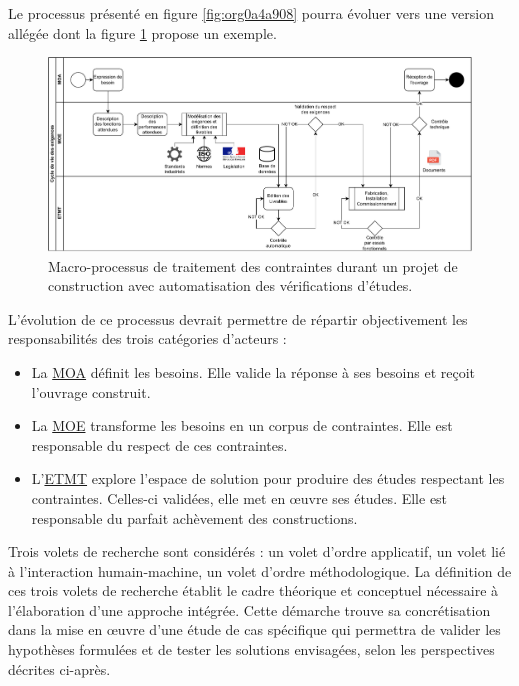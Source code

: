 \documentclass[a4paper,12pt]{article}
\begin{document}
Le processus présenté en figure \ref{fig:org0a4a908} pourra évoluer vers une version allégée dont la figure \ref{fig:org8957f45} propose un exemple.

\begin{figure}[htbp]
\centering
\includegraphics[width=.9\linewidth]{../svg/BPMN-LifeCycle-Exigences-target.pdf}
\caption{\label{fig:org8957f45}Macro-processus de traitement des contraintes durant un projet de construction avec automatisation des vérifications d’études.}
\end{figure}

L’évolution de ce processus devrait permettre de répartir objectivement les responsabilités des trois catégories d’acteurs : 
\begin{itemize}
\item La \protect\hyperlink{gls-8}{\label{gls-8-use-2}MOA} définit les besoins. Elle valide la réponse à ses besoins et reçoit l’ouvrage construit.
\item La \protect\hyperlink{gls-9}{\label{gls-9-use-2}MOE} transforme les besoins en un corpus de contraintes. Elle est responsable du respect de ces contraintes.
\item L’\protect\hyperlink{gls-10}{\label{gls-10-use-2}ETMT} explore l’espace de solution pour produire des études respectant les contraintes. Celles-ci validées, elle met en œuvre ses études. Elle est responsable du parfait achèvement des constructions.
\end{itemize}

Trois volets de recherche sont considérés : un volet d’ordre applicatif, un volet lié à l'interaction humain-machine, un volet d’ordre méthodologique. La définition de ces trois volets de recherche établit le cadre théorique et conceptuel nécessaire à l'élaboration d'une approche intégrée. Cette démarche trouve sa concrétisation dans la mise en œuvre d'une étude de cas spécifique qui permettra de valider les hypothèses formulées et de tester les solutions envisagées, selon les perspectives décrites ci-après.
\end{document}
